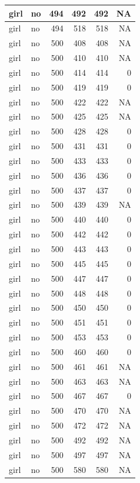 \documentclass[man]{apa6}
\begin{document}
\begin{tabular}{l|l|r|r|r|r}
\hline
girl & no & 494 & 492 & 492 & NA\\
\hline
girl & no & 494 & 518 & 518 & NA\\
\hline
girl & no & 500 & 408 & 408 & NA\\
\hline
girl & no & 500 & 410 & 410 & NA\\
\hline
girl & no & 500 & 414 & 414 & 0\\
\hline
girl & no & 500 & 419 & 419 & 0\\
\hline
girl & no & 500 & 422 & 422 & NA\\
\hline
girl & no & 500 & 425 & 425 & NA\\
\hline
girl & no & 500 & 428 & 428 & 0\\
\hline
girl & no & 500 & 431 & 431 & 0\\
\hline
girl & no & 500 & 433 & 433 & 0\\
\hline
girl & no & 500 & 436 & 436 & 0\\
\hline
girl & no & 500 & 437 & 437 & 0\\
\hline
girl & no & 500 & 439 & 439 & NA\\
\hline
girl & no & 500 & 440 & 440 & 0\\
\hline
girl & no & 500 & 442 & 442 & 0\\
\hline
girl & no & 500 & 443 & 443 & 0\\
\hline
girl & no & 500 & 445 & 445 & 0\\
\hline
girl & no & 500 & 447 & 447 & 0\\
\hline
girl & no & 500 & 448 & 448 & 0\\
\hline
girl & no & 500 & 450 & 450 & 0\\
\hline
girl & no & 500 & 451 & 451 & 0\\
\hline
girl & no & 500 & 453 & 453 & 0\\
\hline
girl & no & 500 & 460 & 460 & 0\\
\hline
girl & no & 500 & 461 & 461 & NA\\
\hline
girl & no & 500 & 463 & 463 & NA\\
\hline
girl & no & 500 & 467 & 467 & 0\\
\hline
girl & no & 500 & 470 & 470 & NA\\
\hline
girl & no & 500 & 472 & 472 & NA\\
\hline
girl & no & 500 & 492 & 492 & NA\\
\hline
girl & no & 500 & 497 & 497 & NA\\
\hline
girl & no & 500 & 580 & 580 & NA\\

\end{tabular}
\end{document}
